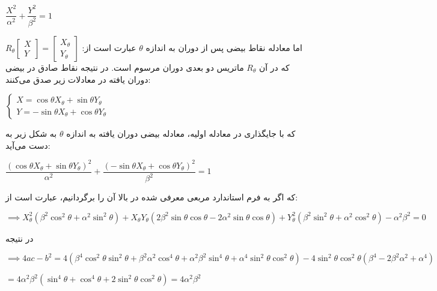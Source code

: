 \documentclass{scribe-cgenomics}
\begin{document}
\begin{حل}
\begin{center}
$
\dfrac{X^2}{\alpha ^2} + \dfrac{Y^2}{\beta ^2} = 1
$
\end{center}

اما معادله نقاط بیضی پس از دوران به اندازه
$\theta$
عبارت است از:
$R_{\theta} 
\begin{bmatrix}
X \\ Y
\end{bmatrix}
 = \begin{bmatrix}
 X_{\theta} \\ Y_{\theta}
 \end{bmatrix}
 $
 که در آن
 $R_{\theta}$
 ماتریس دو بعدی دوران مرسوم است. در نتیجه نقاط صادق در بیضی دوران یافته در معادلات زیر صدق می‌کنند:
 
\begin{center}
$
\begin{cases}
X = \cos \theta X_{\theta} + \sin \theta Y_{\theta} \\
Y = -\sin \theta X_{\theta} + \cos \theta Y_{\theta}
\end{cases}
$
\end{center}

که با جایگذاری در معادله اولیه، معادله بیضی دوران یافته به اندازه
$\theta$
به شکل زیر به دست می‌آید:

\begin{center}
$
\dfrac{(\cos \theta X_{\theta} + \sin \theta Y_{\theta})^2}{\alpha ^2} + \dfrac{(-\sin \theta X_{\theta} + \cos \theta Y_{\theta})^2}{\beta ^2} = 1
$
\end{center}

که اگر به فرم استاندارد مربعی معرفی شده در بالا آن را برگردانیم، عبارت است از:

\begin{center}
$
\implies X_{\theta}^2(\beta ^2 \cos^2 \theta + \alpha^2 \sin^2 \theta) + 
X_{\theta}Y_{\theta} (2\beta^2\sin \theta \cos \theta - 2\alpha^2 \sin \theta \cos \theta) + 
Y_{\theta}^2 (\beta^2\sin^2 \theta + \alpha^2 \cos^2 \theta) - \alpha^2 \beta^2 = 0
$
\end{center}

در نتیجه

\begin{center}
$
\implies 4ac - b^2 = 4 (\beta^4\cos^2 \theta \sin^2 \theta + \beta^2\alpha^2 \cos^4 \theta + \alpha^2 \beta^2\sin^4 \theta + \alpha^4 \sin^2 \theta \cos^2 \theta) - 4\sin^2 \theta \cos^2 \theta (\beta^4 -2\beta^2\alpha^2 + \alpha^4)
$

$
= 4 \alpha^2\beta^2 (\sin^4 \theta + \cos^4 \theta + 2\sin^2 \theta \cos^2 \theta) = 4\alpha^2 \beta^2
$
\end{center}


\end{حل}
\end{document}
